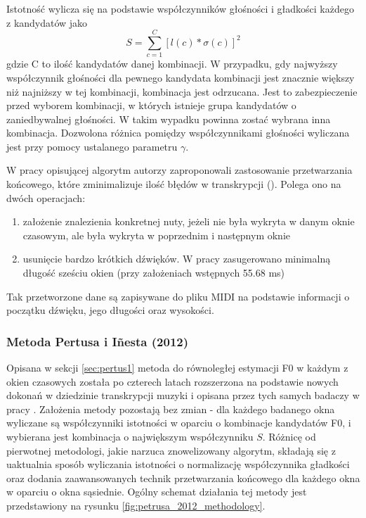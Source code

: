 \documentclass[12pt,a4paper,twoside]{mwart}
\begin{document}
Istotność wylicza się na podstawie współczynników głośności i gładkości każdego z kandydatów jako
\begin{equation}\label{eq:inharmonicity:salience}
  S = \sum_{c=1}^C\left[l(c)*\sigma(c)\right]^2
\end{equation}
gdzie C to ilość kandydatów danej kombinacji. W przypadku, gdy najwyższy współczynnik głośności dla pewnego kandydata kombinacji jest znacznie większy niż najniższy w tej kombinacji, kombinacja jest odrzucana. Jest to zabezpieczenie przed wyborem kombinacji, w których istnieje grupa kandydatów o zaniedbywalnej głośności. W takim wypadku powinna zostać wybrana inna kombinacja. Dozwolona różnica pomiędzy współczynnikami głośności wyliczana jest przy pomocy ustalanego parametru $\gamma$.

W pracy opisującej algorytm autorzy zaproponowali zastosowanie przetwarzania końcowego, które zminimalizuje ilość błędów w transkrypcji (\cite[106-107]{Transcription:Pertus:Inharmonicity}). Polega ono na dwóch operacjach:
\begin{enumerate}
  \item założenie znalezienia konkretnej nuty, jeżeli nie była wykryta w danym oknie czasowym, ale była wykryta w poprzednim i następnym oknie
  \item usunięcie bardzo krótkich dźwięków. W pracy zasugerowano minimalną długość sześciu okien (przy założeniach wstępnych 55.68 ms)
\end{enumerate}
Tak przetworzone dane są zapisywane do pliku MIDI na podstawie informacji o początku dźwięku, jego długości oraz wysokości.

\subsubsection{Metoda Pertusa i Iñesta (2012)}\label{sec:petrus2}
Opisana w sekcji \ref{sec:pertus1} metoda do równoległej estymacji F0 w każdym z okien czasowych została po czterech latach rozszerzona na podstawie nowych dokonań w dziedzinie transkrypcji muzyki i opisana przez tych samych badaczy w pracy \cite{Transcription:Pertus:Inharmonicity2}. Założenia metody pozostają bez zmian - dla każdego badanego okna wyliczane są współczynniki istotności w oparciu o kombinacje kandydatów F0, i wybierana jest kombinacja o największym współczynniku $S$. Różnicę od pierwotnej metodologi, jakie narzuca znowelizowany algorytm, składają się z uaktualnia sposób wyliczania istotności o normalizację współczynnika gładkości oraz dodania zaawansowanych technik przetwarzania końcowego dla każdego okna w oparciu o okna sąsiednie. Ogólny schemat działania tej metody jest przedstawiony na rysunku \ref{fig:petrusa_2012_methodology}.
\end{document}
